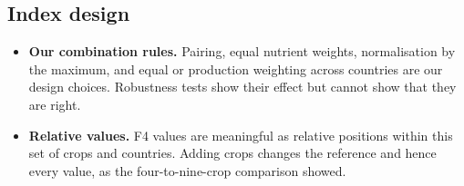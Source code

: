 \subsection{Index design}
\begin{itemize}
\item \textbf{Our combination rules.} Pairing, equal nutrient weights, normalisation by the maximum, and equal or
production weighting across countries are our design choices. Robustness tests show their effect but cannot show
that they are right.
\item \textbf{Relative values.} F4 values are meaningful as relative positions within this set of crops and
countries. Adding crops changes the reference and hence every value, as the four-to-nine-crop comparison showed.
\end{itemize}
